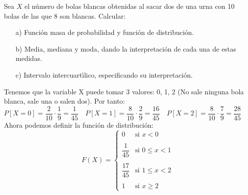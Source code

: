 \problem

Sea $X$ el n{\'u}mero de bolas blancas obtenidas al sacar dos de una urna con 10 bolas de las que 8 son blancas.
Calcular: \begin{itemize} \item [a)] Funci{\'o}n masa de probabilidad y  funci{\'o}n de
	distribuci{\'o}n. \item [b)] Media, mediana y moda, dando la interpretaci{\'o}n de cada
	una de estas medidas.\item [c)]Intervalo intercuart{\'\i}lico,  especificando  su
	interpretaci{\'o}n.\end{itemize}

\subproblem
Tenemos que la variable X puede tomar 3 valores: 0, 1, 2 (No sale ninguna bola blanca, sale una o salen dos). Por tanto: \\

$P[X = 0] = \dfrac{2}{10}\cdot\dfrac{1}{9} = \dfrac{1}{45} \quad
P[X = 1] = \dfrac{8}{10}\cdot\dfrac{2}{9} = \dfrac{16}{45} \quad 
P[X = 2] = \dfrac{8}{10}\cdot\dfrac{7}{9} = \dfrac{28}{45}$ \\

Ahora podemos definir la función de distribución: \\

$$
F(X) = \left\{
     \begin{array}{lr}
       0 & \mbox{si }  x < 0 \\
       \\
       \dfrac{1}{45} & \mbox{si }0 \leq x < 1 \\
       \\
       \dfrac{17}{45}& \mbox{si }  1 \leq x < 2 \\
       \\
       1 & \mbox{si } x \geq 2
     \end{array}
   \right.
$$
\\

